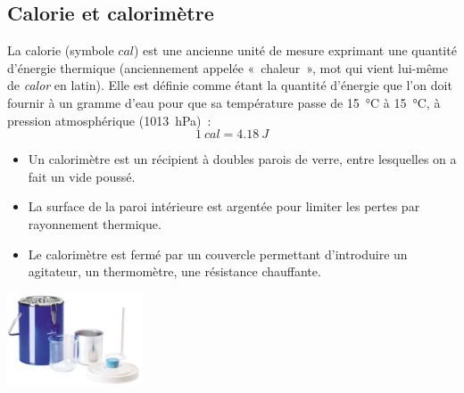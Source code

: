 \documentclass[../main/main.tex]{subfiles}
\begin{document}
{	\subsection{Calorie et calorimètre}
	La calorie (symbole $\si{cal}$) est une ancienne unité de mesure exprimant une
	quantité d'énergie thermique (anciennement appelée «~chaleur~», mot qui vient
	lui-même de \textit{calor} en latin). Elle est définie comme étant la quantité
	d'énergie que l'on doit fournir à un gramme d'eau pour que sa température
	passe de \SI{15}{\degreeCelsius} à \SI{15}{\degreeCelsius}, à pression
	atmosphérique (\SI{1013}{hPa})~:
	\[
		\SI{1}{cal} = \SI{4.18}{J}
	\]
	\noindent
	\begin{minipage}[c]{.75\linewidth}
		\begin{itemize}
			\item Un calorimètre est un récipient à doubles parois de verre, entre
			      lesquelles on a fait un vide poussé.
			\item La surface de la paroi intérieure est argentée pour limiter les pertes
			      par rayonnement thermique.
			\item Le calorimètre est fermé par un couvercle permettant d'introduire un
			      agitateur, un thermomètre, une résistance chauffante.
		\end{itemize}
	\end{minipage}
	\hfill
	\noindent
	\begin{minipage}[c]{.20\linewidth}
		\begin{center}
			\includegraphics[width=\linewidth]{calo}
		\end{center}
	\end{minipage}
	\begin{itemize}

\end{itemize}}
\end{document}
